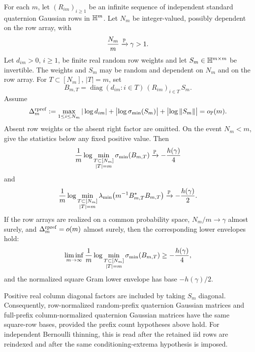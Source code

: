 \begin{corollary}\label{cor:quat-random-prefix-conditioning-exact}
For each \(m\), let \((R_{im})_{i\ge1}\) be an infinite sequence of independent
standard quaternion Gaussian rows in \(\mathbb{H}^m\).  Let \(N_m\) be integer-valued,
possibly dependent on the row array, with
\[
  \frac{N_m}{m}\xrightarrow{\mathbb{P}}\gamma>1 .
\]
Let \(d_{im}>0\), \(i\ge1\), be finite real random row weights and let
\(S_m\in\mathbb{H}^{m\times m}\) be invertible.  The weights and \(S_m\) may be
random and dependent on \(N_m\) and on the row array.  For
\(T\subset[N_m]\), \(|T|=m\), set
\[
  B_{m,T}=\operatorname{diag}(d_{im}:i\in T)\,(R_{im})_{i\in T}\,S_m .
\]
Assume
\[
  \Delta_m^{\rm rpref}:=
  \max_{1\le i\le N_m}|\log d_{im}|
  +\bigl|\log\sigma_{\min}(S_m)\bigr|+\bigl|\log\|S_m\|\bigr|
  =o_{\mathbb{P}}(m).
\]
Absent row weights or the absent right factor are omitted.  On the event
\(N_m<m\), give the statistics below any fixed positive value.  Then
\[
  \frac1m\log
  \min_{\substack{T\subset[N_m]\\ |T|=m}}\sigma_{\min}(B_{m,T})
  \xrightarrow{\mathbb{P}}
  -\frac{h(\gamma)}4
\]
and
\[
  \frac1m\log
  \min_{\substack{T\subset[N_m]\\ |T|=m}}
  \lambda_{\min}\!\left(m^{-1}B_{m,T}^*B_{m,T}\right)
  \xrightarrow{\mathbb{P}}
  -\frac{h(\gamma)}2 .
\]
If the row arrays are realized on a common probability space,
\(N_m/m\to\gamma\) almost surely, and
\(\Delta_m^{\rm rpref}=o(m)\) almost surely, then the corresponding lower
envelopes hold:
\[
  \liminf_{m\to\infty}\frac1m\log
  \min_{\substack{T\subset[N_m]\\ |T|=m}}\sigma_{\min}(B_{m,T})
  \ge -\frac{h(\gamma)}4,
\]
and the normalized square Gram lower envelope has base \(-h(\gamma)/2\).

Positive real column diagonal factors are included by taking \(S_m\) diagonal.
Consequently, row-normalized random-prefix quaternion Gaussian matrices and
full-prefix column-normalized quaternion Gaussian matrices have the same
square-row bases, provided the prefix count hypotheses above hold.  For
independent Bernoulli thinning, this is read after the retained iid rows are
reindexed and after the same conditioning-extrema hypothesis is imposed.
\end{corollary}

